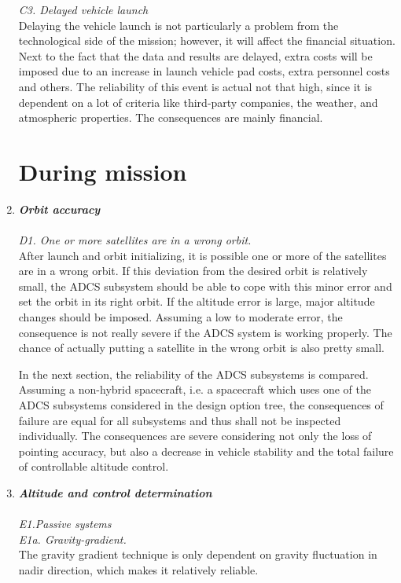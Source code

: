 \begin{enumerate}[A]
\textit{C3. Delayed vehicle launch}\\
Delaying the vehicle launch is not particularly a problem from the technological side of the mission; however, it will affect the financial situation. Next to the fact that the data and results are delayed, extra costs will be imposed due to an increase in launch vehicle pad costs, extra personnel costs and others. The reliability of this event is actual not that high, since it is dependent on a lot of criteria like third-party companies, the weather, and atmospheric properties. The consequences are mainly financial.

\section{During mission}
\label{blTRADm}
	\item  \textbf{\textit{Orbit accuracy }} \\\\
\textit{D1. One or more satellites are in a wrong orbit.}\\
After launch and orbit initializing, it is possible one or more of the satellites are in a wrong orbit. If this deviation from the desired orbit is relatively small, the ADCS subsystem should be able to cope with this minor error and set the orbit in its right orbit. If the altitude error is large, major altitude changes should be imposed. Assuming a low to moderate error, the consequence is not really severe if the ADCS system is working properly. The chance of actually putting a satellite in the wrong orbit is also pretty small.

In the next section, the reliability of the ADCS subsystems is compared. Assuming a non-hybrid spacecraft, i.e. a spacecraft which uses one of the ADCS subsystems considered in the design option tree, the consequences of failure are equal for all subsystems and thus shall not be inspected individually. The consequences are severe considering not only the loss of pointing accuracy, but also a decrease in vehicle stability and the total failure of controllable altitude control.  	

	\item  \textbf{\textit{Altitude and control determination }} \\\\
\textit{E1.Passive systems}\\

\textit{E1a. Gravity-gradient.}\\
The gravity gradient technique is only dependent on gravity fluctuation in nadir direction, which makes it relatively reliable.


\end{enumerate}
